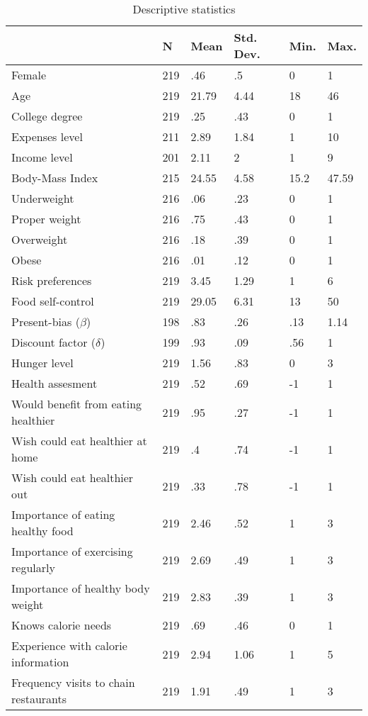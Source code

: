 \begin{table}[h] \centering
{}

\caption{Descriptive statistics}
\label{tab:descriptiveStatistics}
\begin{tabularx}{\linewidth}{lCCCCC}

\toprule
{}&{N}&{Mean}&{Std. Dev.}&{Min.}&{Max.} \tabularnewline
\midrule \addlinespace[\belowrulesep]
Female&219&.46&.5&0&1 \tabularnewline
Age&219&21.79&4.44&18&46 \tabularnewline
College degree&219&.25&.43&0&1 \tabularnewline
Expenses level&211&2.89&1.84&1&10 \tabularnewline
Income level&201&2.11&2&1&9 \tabularnewline
Body-Mass Index&215&24.55&4.58&15.2&47.59 \tabularnewline
Underweight&216&.06&.23&0&1 \tabularnewline
Proper weight&216&.75&.43&0&1 \tabularnewline
Overweight&216&.18&.39&0&1 \tabularnewline
Obese&216&.01&.12&0&1 \tabularnewline
\midrule Risk preferences&219&3.45&1.29&1&6 \tabularnewline
Food self-control&219&29.05&6.31&13&50 \tabularnewline
Present-bias (\(\beta\))&198&.83&.26&.13&1.14 \tabularnewline
Discount factor (\(\delta\))&199&.93&.09&.56&1 \tabularnewline
Hunger level&219&1.56&.83&0&3 \tabularnewline
\midrule Health assesment&219&.52&.69&-1&1 \tabularnewline
Would benefit from eating healthier&219&.95&.27&-1&1 \tabularnewline
Wish could eat healthier at home&219&.4&.74&-1&1 \tabularnewline
Wish could eat healthier out&219&.33&.78&-1&1 \tabularnewline
Importance of eating healthy food&219&2.46&.52&1&3 \tabularnewline
Importance of exercising regularly&219&2.69&.49&1&3 \tabularnewline
Importance of healthy body weight&219&2.83&.39&1&3 \tabularnewline
\midrule Knows calorie needs&219&.69&.46&0&1 \tabularnewline
Experience with calorie information&219&2.94&1.06&1&5 \tabularnewline
Frequency visits to chain restaurants&219&1.91&.49&1&3 \tabularnewline
\bottomrule 

\end{tabularx}
\end{table}
